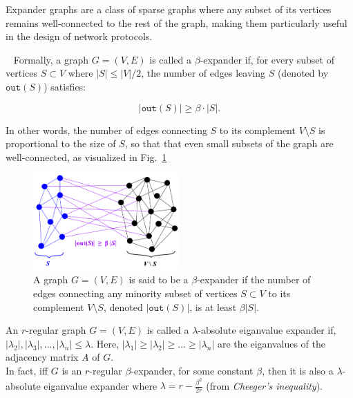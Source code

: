 Expander graphs are a class of sparse graphs where any subset of its vertices remains well-connected to the rest of the graph, making them particularly useful in the design of network protocols.

\begin{definition}  \label{def:beta-expander} ~\cite[Def. 1]{10.1007/3-540-49543-6_1}
    Formally, a graph $G = (V, E)$ is called a $\beta$-expander if, for every subset of vertices $S \subset V$ where $|S| \leq |V|/2$, the number of edges leaving $S$ (denoted by $\texttt{out}(S)$) satisfies:
    
    $$
    |\texttt{out}(S)| \geq \beta \cdot |S|.
    $$
    
    In other words, the number of edges connecting $S$ to its complement $V \setminus S$ is proportional to the size of $S$, so that that even small subsets of the graph are well-connected, as visualized in Fig.~\ref{fig:beta-expander}\\

    \begin{figure}
        \centering
        \includegraphics[width=0.5\textwidth]{template/figures/Expander graph.png}
        \caption{A graph $G = (V, E)$ is said to be a $\beta$-expander if the number of edges connecting any minority subset of vertices $S \subset V$ to its complement $V \setminus S$, denoted $|\texttt{out}(S)|$, is at least $\beta |S|$.}
        \label{fig:beta-expander}
    \end{figure}

\end{definition}

\begin{definition}  \label{def:eiganvalue-expander}
     An $r$-regular graph $G = (V, E)$ is called a $\lambda$-absolute eiganvalue expander if, $|\lambda_2|,|\lambda_3|,...,|\lambda_n| \leq \lambda$. Here, $|\lambda_1| \geq |\lambda_2| \geq ... \geq |\lambda_n|$ are the eiganvalues of the adjacency matrix $A$ of $G$.\\

     In fact, iff $G$ is an $r$-regular $\beta$-expander, for some constant $\beta$, then it is also a $\lambda$-absolute eiganvalue expander where $\lambda = r - \frac{\beta^2}{2r}$ (from \textit{Cheeger's inequality}).
\end{definition}

